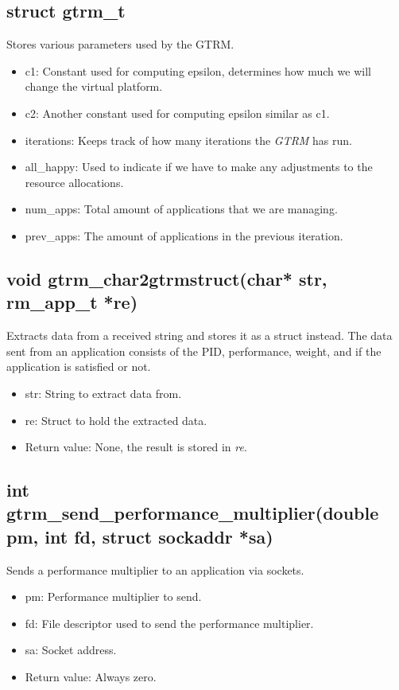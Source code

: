 \documentclass[nobiblatex]{LTHthesis}
\begin{document}
\subsection{struct gtrm\_t}
Stores various parameters used by the GTRM.
\begin{itemize}
\item c1: Constant used for computing epsilon, determines how much we will change the virtual platform.
\item c2: Another constant used for computing epsilon similar as c1.
\item iterations: Keeps track of how many iterations the \emph{GTRM} has run.
\item all\_happy: Used to indicate if we have to make any adjustments to the resource allocations.
\item num\_apps: Total amount of applications that we are managing.
\item prev\_apps: The amount of applications in the previous iteration.
\end{itemize}

\subsection{void gtrm\_char2gtrmstruct(char* str, rm\_app\_t *re)}
Extracts data from a received string and stores it as a struct instead. The data sent from an application consists of the PID, performance, weight, and if the application is satisfied or not.
\begin{itemize} 
\item str: String to extract data from.
\item re: Struct to hold the extracted data.
\item Return value: None, the result is stored in \emph{re}.
\end{itemize}

\subsection{int gtrm\_send\_performance\_multiplier(double pm, int fd, struct sockaddr *sa)}
Sends a performance multiplier to an application via sockets.
\begin{itemize} 
\item pm: Performance multiplier to send.
\item fd: File descriptor used to send the performance multiplier.
\item sa: Socket address.
\item Return value: Always zero.
\end{itemize}
\end{document}
